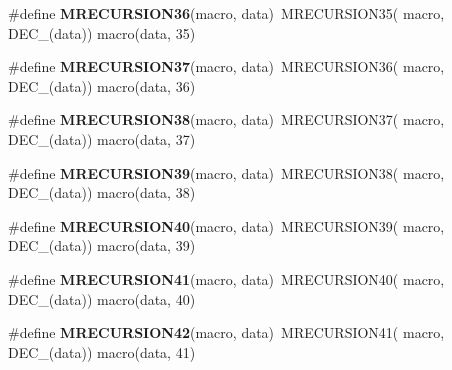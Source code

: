 \begin{DoxyCompactItemize}
\item 
\hypertarget{group__group__sam0__utils__mrecursion_gaedf0d84c05535e2176c874e6e33ee175}{}\#define {\bfseries M\+R\+E\+C\+U\+R\+S\+I\+O\+N36}(macro,  data)~M\+R\+E\+C\+U\+R\+S\+I\+O\+N35(  macro, D\+E\+C\+\_\+(data))   macro(data, 35)\label{group__group__sam0__utils__mrecursion_gaedf0d84c05535e2176c874e6e33ee175}

\item 
\hypertarget{group__group__sam0__utils__mrecursion_gaae1f3283975fe24b9f70597329a3e87f}{}\#define {\bfseries M\+R\+E\+C\+U\+R\+S\+I\+O\+N37}(macro,  data)~M\+R\+E\+C\+U\+R\+S\+I\+O\+N36(  macro, D\+E\+C\+\_\+(data))   macro(data, 36)\label{group__group__sam0__utils__mrecursion_gaae1f3283975fe24b9f70597329a3e87f}

\item 
\hypertarget{group__group__sam0__utils__mrecursion_ga88be78dfd27dc8ef724cd937c81715ef}{}\#define {\bfseries M\+R\+E\+C\+U\+R\+S\+I\+O\+N38}(macro,  data)~M\+R\+E\+C\+U\+R\+S\+I\+O\+N37(  macro, D\+E\+C\+\_\+(data))   macro(data, 37)\label{group__group__sam0__utils__mrecursion_ga88be78dfd27dc8ef724cd937c81715ef}

\item 
\hypertarget{group__group__sam0__utils__mrecursion_ga39b95086189f23b6fab245afd2b34d76}{}\#define {\bfseries M\+R\+E\+C\+U\+R\+S\+I\+O\+N39}(macro,  data)~M\+R\+E\+C\+U\+R\+S\+I\+O\+N38(  macro, D\+E\+C\+\_\+(data))   macro(data, 38)\label{group__group__sam0__utils__mrecursion_ga39b95086189f23b6fab245afd2b34d76}

\item 
\hypertarget{group__group__sam0__utils__mrecursion_gae9edc373382a06fbc22889a81e2cd6eb}{}\#define {\bfseries M\+R\+E\+C\+U\+R\+S\+I\+O\+N40}(macro,  data)~M\+R\+E\+C\+U\+R\+S\+I\+O\+N39(  macro, D\+E\+C\+\_\+(data))   macro(data, 39)\label{group__group__sam0__utils__mrecursion_gae9edc373382a06fbc22889a81e2cd6eb}

\item 
\hypertarget{group__group__sam0__utils__mrecursion_ga18ead39c9c6dcb6c6f62f3d140bd650b}{}\#define {\bfseries M\+R\+E\+C\+U\+R\+S\+I\+O\+N41}(macro,  data)~M\+R\+E\+C\+U\+R\+S\+I\+O\+N40(  macro, D\+E\+C\+\_\+(data))   macro(data, 40)\label{group__group__sam0__utils__mrecursion_ga18ead39c9c6dcb6c6f62f3d140bd650b}

\item 
\hypertarget{group__group__sam0__utils__mrecursion_ga5190bae99648624874678a2bbde2cfb9}{}\#define {\bfseries M\+R\+E\+C\+U\+R\+S\+I\+O\+N42}(macro,  data)~M\+R\+E\+C\+U\+R\+S\+I\+O\+N41(  macro, D\+E\+C\+\_\+(data))   macro(data, 41)\label{group__group__sam0__utils__mrecursion_ga5190bae99648624874678a2bbde2cfb9}


\end{DoxyCompactItemize}
